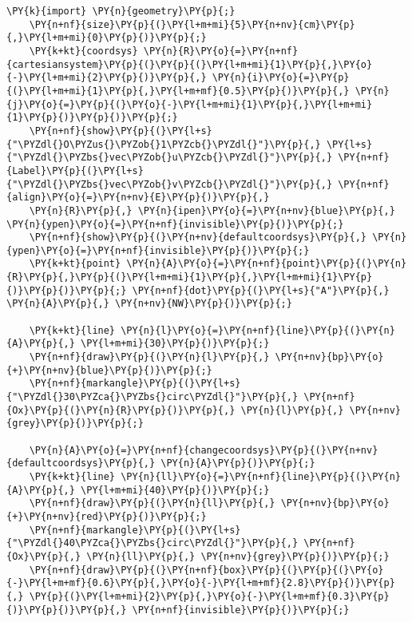 \begin{Verbatim}[commandchars=\\\{\}]
    \PY{k}{import} \PY{n}{geometry}\PY{p}{;}
    \PY{n+nf}{size}\PY{p}{(}\PY{l+m+mi}{5}\PY{n+nv}{cm}\PY{p}{,}\PY{l+m+mi}{0}\PY{p}{)}\PY{p}{;}
    \PY{k+kt}{coordsys} \PY{n}{R}\PY{o}{=}\PY{n+nf}{cartesiansystem}\PY{p}{(}\PY{p}{(}\PY{l+m+mi}{1}\PY{p}{,}\PY{o}{-}\PY{l+m+mi}{2}\PY{p}{)}\PY{p}{,} \PY{n}{i}\PY{o}{=}\PY{p}{(}\PY{l+m+mi}{1}\PY{p}{,}\PY{l+m+mf}{0.5}\PY{p}{)}\PY{p}{,} \PY{n}{j}\PY{o}{=}\PY{p}{(}\PY{o}{-}\PY{l+m+mi}{1}\PY{p}{,}\PY{l+m+mi}{1}\PY{p}{)}\PY{p}{)}\PY{p}{;}
    \PY{n+nf}{show}\PY{p}{(}\PY{l+s}{"\PYZdl{}O\PYZus{}\PYZob{}1\PYZcb{}\PYZdl{}"}\PY{p}{,} \PY{l+s}{"\PYZdl{}\PYZbs{}vec\PYZob{}u\PYZcb{}\PYZdl{}"}\PY{p}{,} \PY{n+nf}{Label}\PY{p}{(}\PY{l+s}{"\PYZdl{}\PYZbs{}vec\PYZob{}v\PYZcb{}\PYZdl{}"}\PY{p}{,} \PY{n+nf}{align}\PY{o}{=}\PY{n+nv}{E}\PY{p}{)}\PY{p}{,}
    \PY{n}{R}\PY{p}{,} \PY{n}{ipen}\PY{o}{=}\PY{n+nv}{blue}\PY{p}{,} \PY{n}{ypen}\PY{o}{=}\PY{n+nf}{invisible}\PY{p}{)}\PY{p}{;}
    \PY{n+nf}{show}\PY{p}{(}\PY{n+nv}{defaultcoordsys}\PY{p}{,} \PY{n}{ypen}\PY{o}{=}\PY{n+nf}{invisible}\PY{p}{)}\PY{p}{;}
    \PY{k+kt}{point} \PY{n}{A}\PY{o}{=}\PY{n+nf}{point}\PY{p}{(}\PY{n}{R}\PY{p}{,}\PY{p}{(}\PY{l+m+mi}{1}\PY{p}{,}\PY{l+m+mi}{1}\PY{p}{)}\PY{p}{)}\PY{p}{;} \PY{n+nf}{dot}\PY{p}{(}\PY{l+s}{"A"}\PY{p}{,} \PY{n}{A}\PY{p}{,} \PY{n+nv}{NW}\PY{p}{)}\PY{p}{;}

    \PY{k+kt}{line} \PY{n}{l}\PY{o}{=}\PY{n+nf}{line}\PY{p}{(}\PY{n}{A}\PY{p}{,} \PY{l+m+mi}{30}\PY{p}{)}\PY{p}{;}
    \PY{n+nf}{draw}\PY{p}{(}\PY{n}{l}\PY{p}{,} \PY{n+nv}{bp}\PY{o}{+}\PY{n+nv}{blue}\PY{p}{)}\PY{p}{;}
    \PY{n+nf}{markangle}\PY{p}{(}\PY{l+s}{"\PYZdl{}30\PYZca{}\PYZbs{}circ\PYZdl{}"}\PY{p}{,} \PY{n+nf}{Ox}\PY{p}{(}\PY{n}{R}\PY{p}{)}\PY{p}{,} \PY{n}{l}\PY{p}{,} \PY{n+nv}{grey}\PY{p}{)}\PY{p}{;}

    \PY{n}{A}\PY{o}{=}\PY{n+nf}{changecoordsys}\PY{p}{(}\PY{n+nv}{defaultcoordsys}\PY{p}{,} \PY{n}{A}\PY{p}{)}\PY{p}{;}
    \PY{k+kt}{line} \PY{n}{ll}\PY{o}{=}\PY{n+nf}{line}\PY{p}{(}\PY{n}{A}\PY{p}{,} \PY{l+m+mi}{40}\PY{p}{)}\PY{p}{;}
    \PY{n+nf}{draw}\PY{p}{(}\PY{n}{ll}\PY{p}{,} \PY{n+nv}{bp}\PY{o}{+}\PY{n+nv}{red}\PY{p}{)}\PY{p}{;}
    \PY{n+nf}{markangle}\PY{p}{(}\PY{l+s}{"\PYZdl{}40\PYZca{}\PYZbs{}circ\PYZdl{}"}\PY{p}{,} \PY{n+nf}{Ox}\PY{p}{,} \PY{n}{ll}\PY{p}{,} \PY{n+nv}{grey}\PY{p}{)}\PY{p}{;}
    \PY{n+nf}{draw}\PY{p}{(}\PY{n+nf}{box}\PY{p}{(}\PY{p}{(}\PY{o}{-}\PY{l+m+mf}{0.6}\PY{p}{,}\PY{o}{-}\PY{l+m+mf}{2.8}\PY{p}{)}\PY{p}{,} \PY{p}{(}\PY{l+m+mi}{2}\PY{p}{,}\PY{o}{-}\PY{l+m+mf}{0.3}\PY{p}{)}\PY{p}{)}\PY{p}{,} \PY{n+nf}{invisible}\PY{p}{)}\PY{p}{;}
\end{Verbatim}
